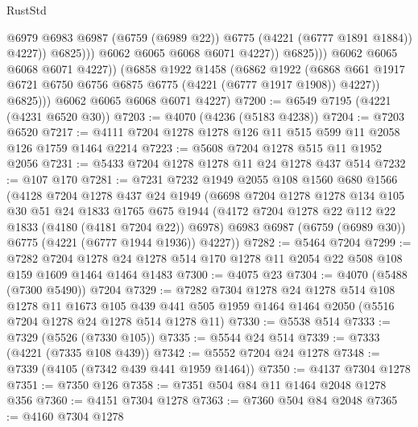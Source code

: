 \begin{lexlean}{RustStd}
\begin{coremodule}
{\begin{coremodule}
{{{{{{{{{{{{{{{{{{{{{{{{{{{{{{{                                  @6979
                                  @6983
                                  @6987
                                  (@6759 (@6989 @22))
                                  @6775
                                  (@4221 (@6777 @1891 @1884))
                                  @4227))
                              @6825)))
                        @6062
                        @6065
                        @6068
                        @6071
                        @4227))
                    @6825)))
              @6062
              @6065
              @6068
              @6071
              @4227))
          (@6858
            @1922
            @1458
            (@6862
              @1922
              (@6868 @661 @1917 @6721 @6750 @6756 @6875 @6775 (@4221 (@6777 @1917 @1908)) @4227))
            @6825)))
      @6062
      @6065
      @6068
      @6071
      @4227)
@7200 := @6549 @7195 (@4221 (@4231 @6520 @30))
@7203 := @4070 (@4236 (@5183 @4238))
@7204 := @7203 @6520
@7217 := @4111 @7204 @1278 @1278 @126 @11 @515 @599 @11 @2058 @126 @1759 @1464 @2214
@7223 := @5608 @7204 @1278 @515 @11 @1952 @2056
@7231 := @5433 @7204 @1278 @1278 @11 @24 @1278 @437 @514
@7232 := @107 @170
@7281 := @7231
    @7232
    @1949
    @2055
    @108
    @1560
    @680
    @1566
    (@4128
      @7204
      @1278
      @437
      @24
      @1949
      (@6698
        @7204
        @1278
        @1278
        @134
        @105
        @30
        @51
        @24
        @1833
        @1765
        @675
        @1944
        (@4172 @7204 @1278 @22 @112 @22 @1833 (@4180 (@4181 @7204 @22)) @6978)
        @6983
        @6987
        (@6759 (@6989 @30))
        @6775
        (@4221 (@6777 @1944 @1936))
        @4227))
@7282 := @5464 @7204
@7299 := @7282
    @7204
    @1278
    @24
    @1278
    @514
    @170
    @1278
    @11
    @2054
    @22
    @508
    @108
    @159
    @1609
    @1464
    @1464
    @1483
@7300 := @4075 @23
@7304 := @4070 (@5488 (@7300 @5490)) @7204
@7329 := @7282
    @7304
    @1278
    @24
    @1278
    @514
    @108
    @1278
    @11
    @1673
    @105
    @439
    @441
    @505
    @1959
    @1464
    @1464
    @2050
    (@5516 @7204 @1278 @24 @1278 @514 @1278 @11)
@7330 := @5538 @514
@7333 := @7329 (@5526 (@7330 @105))
@7335 := @5544 @24 @514
@7339 := @7333 (@4221 (@7335 @108 @439))
@7342 := @5552 @7204 @24 @1278
@7348 := @7339 (@4105 (@7342 @439 @441 @1959 @1464))
@7350 := @4137 @7304 @1278
@7351 := @7350 @126
@7358 := @7351 @504 @84 @11 @1464 @2048 @1278 @356
@7360 := @4151 @7304 @1278
@7363 := @7360 @504 @84 @2048
@7365 := @4160 @7304 @1278
}}}}}}}}}}}}}}}}}}}}}}}}}}}}}}}
\end{coremodule}}
\end{coremodule}
\end{lexlean}
